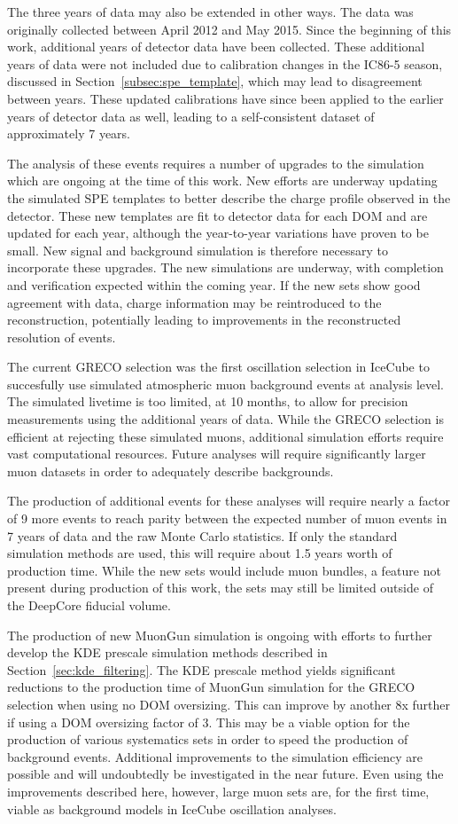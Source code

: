 The three years of data may also be extended in other ways.
The data was originally collected between April 2012 and May 2015.
Since the beginning of this work, additional years of detector data have been collected.
These additional years of data were not included due to calibration changes in the IC86-5 season, discussed in Section~\ref{subsec:spe_template}, which may lead to disagreement between years.
These updated calibrations have since been applied to the earlier years of detector data as well, leading to a self-consistent dataset of approximately 7 years.

The analysis of these events requires a number of upgrades to the simulation which are ongoing at the time of this work.
New efforts are underway updating the simulated SPE templates to better describe the charge profile observed in the detector.
These new templates are fit to detector data for each DOM and are updated for each year, although the year-to-year variations have proven to be small.
New signal and background simulation is therefore necessary to incorporate these upgrades.
The new simulations are underway, with completion and verification expected within the coming year.
If the new sets show good agreement with data, charge information may be reintroduced to the reconstruction, potentially leading to improvements in the reconstructed resolution of events.

The current GRECO selection was the first oscillation selection in IceCube to succesfully use simulated atmospheric muon background events at analysis level.
The simulated livetime is too limited, at 10 months, to allow for precision measurements using the additional years of data.
While the GRECO selection is efficient at rejecting these simulated muons, additional simulation efforts require vast computational resources.
Future analyses will require significantly larger muon datasets in order to adequately describe backgrounds.

The production of additional events for these analyses will require nearly a factor of 9 more events to reach parity between the expected number of muon events in 7 years of data and the raw Monte Carlo statistics.
If only the standard simulation methods are used, this will require about 1.5 years worth of production time.
While the new sets would include muon bundles, a feature not present during production of this work, the sets may still be limited outside of the DeepCore fiducial volume.

The production of new MuonGun simulation is ongoing with efforts to further develop the KDE prescale simulation methods described in Section~\ref{sec:kde_filtering}. 
The KDE prescale method yields significant reductions to the production time of MuonGun simulation for the GRECO selection when using no DOM oversizing.
This can improve by another 8x further if using a DOM oversizing factor of 3.
This may be a viable option for the production of various systematics sets in order to speed the production of background events.
Additional improvements to the simulation efficiency are possible and will undoubtedly be investigated in the near future.
Even using the improvements described here, however, large muon sets are, for the first time, viable as background models in IceCube oscillation analyses.

